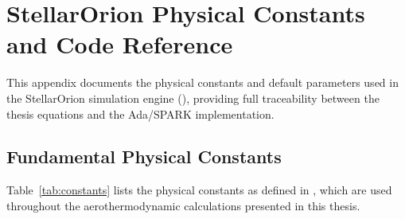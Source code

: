\appendix

\chapter{StellarOrion Physical Constants and Code Reference}
\label{app:code_constants}

This appendix documents the physical constants and default parameters used in the StellarOrion simulation engine (\texttt{}), providing full traceability between the thesis equations and the Ada/SPARK implementation.

\section{Fundamental Physical Constants}
\label{sec:fundamental_constants}

Table~\ref{tab:constants} lists the physical constants as defined in \texttt{}, which are used throughout the aerothermodynamic calculations presented in this thesis.


